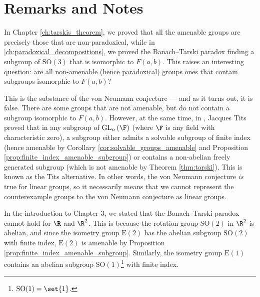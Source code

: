 \section{Remarks and Notes}\label{sec:invariant_states_remarks}%
In Chapter \ref{ch:tarskis_theorem}, we proved that all the amenable groups are precisely those that are non-paradoxical, while in \ref{ch:paradoxical_decompositions}, we proved the Banach--Tarski paradox finding a subgroup of $\text{SO}(3)$ that is isomorphic to $F(a,b)$. This raises an interesting question: are all non-amenable (hence paradoxical) groups ones that contain subgroups isomorphic to $F(a,b)$?\newline

This is the substance of the von Neumann conjecture --- and as it turns out, it is false. There are some groups that are not amenable, but do not contain a subgroup isomorphic to $F(a,b)$. However, at the same time, in \cite{free_subgroups_of_linear_groups}, Jacques Tits proved that in any subgroup of $\text{GL}_n\left(\F\right)$ (where $\F$ is any field with characteristic zero), a subgroup either admits a solvable subgroup of finite index (hence amenable by Corollary \ref{cor:solvable_groups_amenable} and Proposition \ref{prop:finite_index_amenable_subgroup}) or contains a non-abelian freely generated subgroup (which is not amenable by Theorem \ref{thm:tarski}). This is known as the Tits alternative. In other words, the von Neumann conjecture \textit{is} true for linear groups, so it necessarily means that we cannot represent the counterexample groups to the von Neumann conjecture as linear groups.\newline

In the introduction to Chapter 3, we stated that the Banach--Tarski paradox cannot hold for $\R$ and $\R^2$. This is because the rotation group $\text{SO}\left(2\right)$ in $\R^2$ is abelian, and since the isometry group $\text{E}\left(2\right)$ has the abelian subgroup $\text{SO}\left(2\right)$ with finite index, $\text{E}\left(2\right)$ is amenable by Proposition \ref{prop:finite_index_amenable_subgroup}. Similarly, the isometry group $\text{E}(1)$ contains an abelian subgroup $\text{SO}(1)$\footnote{$\text{SO}(1) = \set{1}$.} with finite index.
